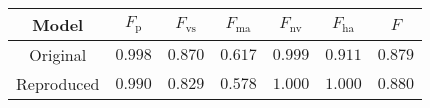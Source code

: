 \begin{tabular}{c|cccccc}
    \textbf{Model} & $F_{\textrm{p}}$ & $F_{\textrm{vs}}$ & $F_{\textrm{ma}}$ & $F_{\textrm{nv}}$ & $F_{\textrm{ha}}$ & $F$ \\\hline
    Original       & $\mathbf{0.998}$ & $\mathbf{0.870}$  & $\mathbf{0.617}$  & $0.999$           & $0.911$           & $0.879$          \\
    Reproduced     & $0.990$          & $0.829$           & $0.578$           & $\mathbf{1.000}$  & $\mathbf{1.000}$  & $\mathbf{0.880}$ \\
\end{tabular}
